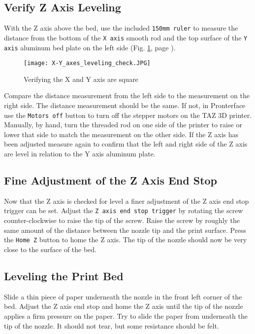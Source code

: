 \subsection{Verify Z Axis Leveling}
With the Z axis above the bed, use the included \texttt{150mm ruler} to measure the distance from the bottom of the \texttt{X axis} smooth rod and the top surface of the \texttt{Y axis} aluminum bed plate on the left side (Fig. \ref{fig:X-Y_axes_leveling_check}, page \pageref{fig:X-Y_axes_leveling_check}).
\begin{figure}[H]
\centering
\texttt{[image: X-Y\_axes\_leveling\_check.JPG]}
\caption{Verifying the X and Y axis are square}
\label{fig:X-Y_axes_leveling_check}
\end{figure} 
Compare the distance measurement from the left side to the measurement on the right side. The distance measurement should be the same. If not, in Pronterface use the \texttt{Motors off} button to turn off the stepper motors on the TAZ 3D printer. Manually, by hand, turn the threaded rod on one side of the printer to raise or lower that side to match the measurement on the other side. If the Z axis has been adjusted measure again to confirm that the left and right side of the Z axis are level in relation to the Y axis aluminum plate.


\subsection{Fine Adjustment of the Z Axis End Stop}
\begin{comment}
\begin{figure}[H]
\centering
\texttt{[image: Z\_end\_stop\_trigger.JPG]}
\caption{Z end stop trigger}
\label{fig:Z_end_stop_trigger}
\end{figure}
\end{comment}
Now that the Z axis is checked for level a finer adjustment of the Z axis end stop trigger can be set.
Adjust the \texttt{Z axis end stop trigger} by rotating the screw counter-clockwise to raise the tip of the screw. Raise the screw by roughly the same amount of the distance between the nozzle tip and the print surface. Press the \texttt{Home Z} button to home the Z axis. The tip of the nozzle should now be very close to the surface of the bed.

\subsection{Leveling the Print Bed}
Slide a thin piece of paper underneath the nozzle in the front left corner of the bed. Adjust the Z axis end stop and home the Z axis until the tip of the nozzle applies a firm pressure on the paper. Try to slide the paper from underneath the tip of the nozzle. It should not tear, but some resistance should be felt.

